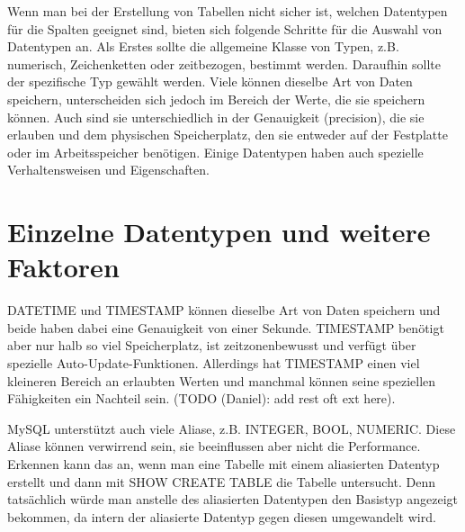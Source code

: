 Wenn man bei der Erstellung von Tabellen nicht sicher ist, welchen Datentypen für die Spalten geeignet sind, bieten sich folgende Schritte für die Auswahl von Datentypen an.
Als Erstes sollte die allgemeine Klasse von Typen, z.B. numerisch, Zeichenketten oder zeitbezogen, bestimmt werden.
Daraufhin sollte der spezifische Typ gewählt werden.
Viele können dieselbe Art von Daten speichern, unterscheiden sich jedoch im Bereich der Werte, die sie speichern können.
Auch sind sie unterschiedlich in der Genauigkeit (precision), die sie erlauben und dem physischen Speicherplatz, den sie entweder auf der Festplatte oder im Arbeitsspeicher benötigen.
Einige Datentypen haben auch spezielle Verhaltensweisen und Eigenschaften.

\section{Einzelne Datentypen und weitere Faktoren}
DATETIME und TIMESTAMP können dieselbe Art von Daten speichern und beide haben dabei eine Genauigkeit von einer Sekunde.
TIMESTAMP benötigt aber nur halb so viel Speicherplatz, ist zeitzonenbewusst und verfügt über spezielle Auto-Update-Funktionen.
Allerdings hat TIMESTAMP einen viel kleineren Bereich an erlaubten Werten und manchmal können seine speziellen Fähigkeiten ein Nachteil sein.
(TODO (Daniel): add rest oft ext here).

MySQL unterstützt auch viele Aliase, z.B. INTEGER, BOOL, NUMERIC.
Diese Aliase können verwirrend sein, sie beeinflussen aber nicht die Performance.
Erkennen kann das an, wenn man eine Tabelle mit einem aliasierten Datentyp erstellt und dann mit SHOW CREATE TABLE die Tabelle untersucht.
Denn tatsächlich würde man anstelle des aliasierten Datentypen den Basistyp angezeigt bekommen, da intern der aliasierte Datentyp gegen diesen umgewandelt wird.

